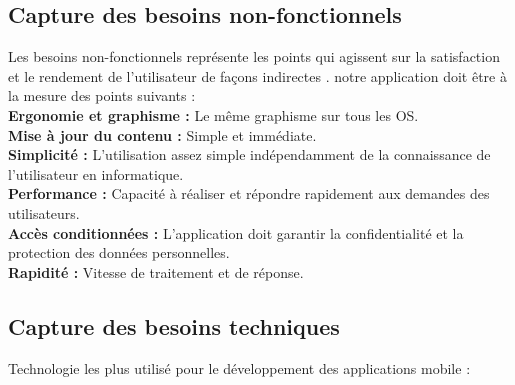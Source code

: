\documentclass[11pt,a4paper,oneside]{book}
\begin{document}
	\subsection{Capture des besoins non-fonctionnels}
	Les besoins non-fonctionnels représente les points qui agissent sur la satisfaction et le rendement de l’utilisateur de façons indirectes .
	notre application doit être à la mesure des points suivants : \\
	\textbf{Ergonomie et graphisme :}  Le même graphisme sur tous les OS.\\
	\textbf{Mise à jour du contenu :} Simple et immédiate.\\
	\textbf{Simplicité :} L’utilisation assez simple indépendamment de la connaissance de l’utilisateur en informatique.\\
	\textbf{Performance :} Capacité à réaliser et répondre rapidement aux demandes
	des utilisateurs.\\
	\textbf{Accès conditionnées :} L’application doit garantir la confidentialité et la protection des données personnelles.\\
	\textbf{Rapidité :} Vitesse de traitement et de réponse.
	\subsection{Capture des besoins techniques}
	Technologie les plus utilisé pour le développement des applications mobile :
	
\end{document}
